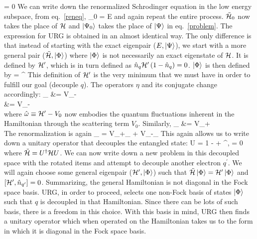 \documentclass[12pt,twoside]{article}
\numberwithin{equation}{section}
\begin{document}
\beq
{} = 0
\eeq
We can write down the renormalized Schrodinger equation in the low energy subspace, from eq.~\ref{reneq},
\beq
\tilde \ham_0  = E
\eeq
and again repeat the entire process. \(\tilde {\mathcal{H}}_0\) now takes the place of \(\mathcal{H}\) and \(\ket{\Psi_0}\) takes the place of \(\ket{\Psi}\) in eq.~\ref{problem}.
\pb The expression for URG is obtained in an almost identical way. The only difference is that instead of starting with the exact eigenpair (\(E,\ket{\Psi}\)), we start with a more general pair (\(\tilde {\mathcal{H}}, \ket{\Phi}\)) where \(\ket{\Phi}\) is not necessarily an exact eigenstate of \(\mathcal{H}\). It is defined by \(\mathcal{H}^\prime\), which is in turn defined as \(\hat n_q \mathcal{H}^\prime\left({1 - \hat n_q}\right) = 0\). \(\ket{\Phi}\) is then defined by
\beq
\ham\ket{\Phi} = \ham^\prime \ket{\Phi}
\eeq
This definition of \(\mathcal{H}^\prime\) is the very minimum that we must have in order to fulfill our goal (decouple \(q\)). 
\pb The operators \(\eta\) and its conjugate change accordingly:
\beq
\rr{\eta}_ &= V_-\\
     &= V_-\\
\eeq
where \(\hat \omega \equiv \mathcal{H}^\prime - V_0\) now embodies the quantum fluctuations inherent in the Hamiltonian through the scattering term \(V_0\). Similarly,
\beq
\rr{\eta^\dagger}_ &= V_+\\
\eeq
The renormalization is again
\beq
\rr{\Delta \ham}_ = V_+\rr{\eta}_ + V_-\rr{\eta^\dagger}_
\eeq
This again allows us to write down a unitary operator that decouples the entangled state:
\beq
U =  1 - \eta + \eta^\dagger,  = 0
\eeq
where \(\tilde {\mathcal{H}} = U^\dagger \mathcal{H} U\). We can now write down a new problem in this decoupled space with the rotated items and attempt to decouple another electron \(q^\prime\). We will again choose some general eigenpair (\(\mathcal{H}^\prime,\ket{\Phi}\)) such that \(\tilde{\mathcal{H}}\ket{\Phi} = \mathcal{H}^{\prime}\ket{\Phi}\) and \(\left[{\mathcal{H}^{\prime},\hat n_{q^\prime}}\right]=0\).
\pb Summarizing, the general Hamiltonian is not diagonal in the Fock space basis.
URG, in order to proceed, selects one non-Fock basis of states \(\ket{\Phi}\) such that \(q\) is decoupled in that Hamiltonian.
Since there can be lots of such basis, there is a freedom in this choice.
With this basis in mind, URG then finds a unitary operator which when operated on the Hamiltonian takes us to the form in which it is diagonal in the Fock space basis.
\end{document}
